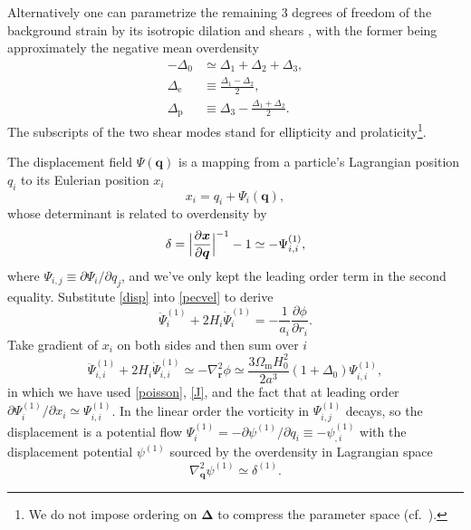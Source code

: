 \documentclass[a4paper,11pt]{article}
\newcommand{\vr}{{\bm r}}
\newcommand{\vx}{{\bm x}}
\newcommand{\vq}{{\bm q}}
\newcommand{\vDelta}{{\bm\Delta}}
\begin{document}
Alternatively one can parametrize the remaining 3 degrees of freedom of the
background strain by its isotropic dilation and shears \cite{BondMyers96I},
with the former being approximately the negative mean overdensity
\begin{align}
    -\Delta_0 &\simeq \Delta_1 + \Delta_2 + \Delta_3, \nonumber\\
    \Delta_\mathrm{e} &\equiv \frac{\Delta_1 - \Delta_2}2, \nonumber\\
    \Delta_\mathrm{p} &\equiv \Delta_3 - \frac{\Delta_1 + \Delta_2}2.
\end{align}
The subscripts of the two shear modes stand for ellipticity and
prolaticity\footnote{We do not impose ordering on $\vDelta$ to compress the
parameter space (cf.\ \cite{BondMyers96I}).}.

The displacement field $\Psi(\vq)$ is a mapping from a particle's Lagrangian
position $q_i$ to its Eulerian position $x_i$
\begin{equation}
    x_i = q_i + \Psi_i(\vq),
    \label{disp}
\end{equation}
whose determinant is related to overdensity by
\begin{equation}
    \delta = \Bigl| \frac{\partial\vx}{\partial\vq} \Bigr|^{-1} - 1
    \simeq - \Psi_{i,i}^{(1)},
    \label{J}
\end{equation}
where $\Psi_{i,j} \equiv \partial\Psi_i / \partial q_j$, and we've only kept
the leading order term in the second equality.
Substitute \eqref{disp} into \eqref{pecvel} to derive
\begin{equation}
    \ddot \Psi_i^{(1)} + 2 H_i \dot \Psi_i^{(1)} = - \frac1{a_i}
    \frac{\partial\phi}{\partial r_i}.
\end{equation}
Take gradient of $x_i$ on both sides and then sum over $i$
\begin{equation}
    \ddot \Psi_{i,i}^{(1)} + 2 H_i \dot \Psi_{i,i}^{(1)} \simeq - \nabla_\vr^2 \phi
    \simeq \frac{3\Omega_\mathrm{m} H_0^2}{2 a^3} (1 + \Delta_0) \Psi_{i,i}^{(1)},
    \label{disp_evo}
\end{equation}
in which we have used \eqref{poisson}, \eqref{J}, and the fact that at leading
order $\partial\Psi_i^{(1)} / \partial x_i \simeq \Psi_{i,i}^{(1)}$.
In the linear order the vorticity in $\Psi_{i,j}^{(1)}$ decays, so the displacement
is a potential flow $\Psi_i^{(1)} = - \partial\psi^{(1)}/ \partial q_i \equiv -\psi_{,i}^{(1)}$
with the displacement potential $\psi^{(1)}$ sourced by the overdensity in Lagrangian
space
\begin{equation}
    \nabla_\vq^2 \psi^{(1)} \simeq \delta^{(1)}.
\end{equation}
\end{document}
